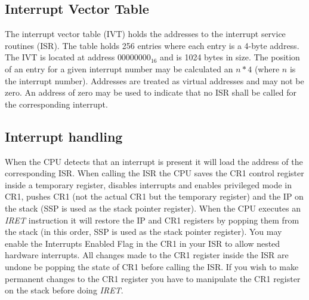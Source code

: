 \subsection{Interrupt Vector Table}

The interrupt vector table (\Gls{IVT}) holds the addresses to the interrupt service routines (ISR). The table holds 256 entries where each entry
is a 4-byte address. The \Gls{IVT} is located at address $00000000_{16}$ and is 1024 bytes in size. The position of an entry for a given interrupt number may be calculated
an $n * 4$ (where $n$ is the interrupt number). Addresses are treated as virtual addresses and may not be zero. An address of zero may be used to indicate
that no ISR shall be called for the corresponding interrupt. 

\subsection{Interrupt handling}

When the CPU detects that an interrupt is present it will load the address of the corresponding ISR. When calling the ISR the CPU saves the CR1 control register inside
a temporary register, disables interrupts and enables privileged mode in CR1, pushes CR1 (not the actual CR1 but the temporary register) and the IP on the stack (SSP is used as the stack pointer register). 
When the CPU executes an \emph{IRET} instruction it will restore the \Gls{IP} and CR1 registers by popping them from the stack (in this order, SSP is used as the stack pointer register). You may enable the Interrupts Enabled Flag in the CR1 in your ISR to allow nested hardware interrupts. All changes made to the CR1 register inside the ISR are undone be popping the state of CR1 before calling the ISR. If you wish to make permanent changes to the CR1 register you have to manipulate the CR1 register on the stack before doing \emph{IRET}. 
